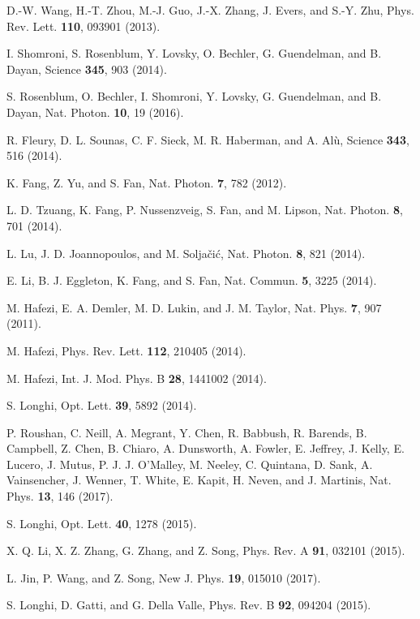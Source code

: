\documentclass[prl,showpacs,superscriptaddress,twocolumn]{revtex4-1}
\begin{document}
\begin{thebibliography}{999}
 D.-W. Wang, H.-T. Zhou, M.-J. Guo, J.-X. Zhang, J. Evers,
and S.-Y. Zhu, Phys. Rev. Lett. \textbf{110}, 093901 (2013).

 I. Shomroni, S. Rosenblum, Y. Lovsky, O. Bechler, G.
Guendelman, and B. Dayan, Science \textbf{345}, 903 (2014).

 S. Rosenblum, O. Bechler, I. Shomroni, Y. Lovsky, G.
Guendelman, and B. Dayan, Nat. Photon. \textbf{10}, 19 (2016).

 R. Fleury, D. L. Sounas, C. F. Sieck, M. R. Haberman,
and A. Al\`{u}, Science \textbf{343}, 516 (2014).

 K. Fang, Z. Yu, and S. Fan, Nat. Photon. \textbf{7}, 782
(2012).

 L. D. Tzuang, K. Fang, P. Nussenzveig, S. Fan, and M.
Lipson, Nat. Photon. \textbf{8}, 701 (2014).

 L. Lu, J. D. Joannopoulos, and M. Solja\v{c}i\'{c}, Nat.
Photon. \textbf{8}, 821 (2014).

 E. Li, B. J. Eggleton, K. Fang, and S. Fan, Nat. Commun.
\textbf{5}, 3225 (2014).

 M. Hafezi, E. A. Demler, M. D. Lukin, and J. M. Taylor,
Nat. Phys. \textbf{7}, 907 (2011).

 M. Hafezi, Phys. Rev. Lett. \textbf{112}, 210405 (2014).

 M. Hafezi, Int. J. Mod. Phys. B \textbf{28}, 1441002
(2014).

 S. Longhi, Opt. Lett. \textbf{39}, 5892 (2014).

 P. Roushan, C. Neill, A. Megrant, Y. Chen, R. Babbush, R.
Barends, B. Campbell, Z. Chen, B. Chiaro, A. Dunsworth, A. Fowler, E.
Jeffrey, J. Kelly, E. Lucero, J. Mutus, P. J. J. O'Malley, M. Neeley, C.
Quintana, D. Sank, A. Vainsencher, J. Wenner, T. White, E. Kapit, H. Neven,
and J. Martinis, Nat. Phys. \textbf{13}, 146 (2017).

 S. Longhi, Opt. Lett. \textbf{40}, 1278 (2015).

 X. Q. Li, X. Z. Zhang, G. Zhang, and Z. Song, Phys. Rev. A
\textbf{91}, 032101 (2015).

 L. Jin, P. Wang, and Z. Song, New J. Phys. \textbf{19},
015010 (2017).

 S. Longhi, D. Gatti, and G. Della Valle, Phys. Rev. B
\textbf{92}, 094204 (2015).


\end{thebibliography}
\end{document}
